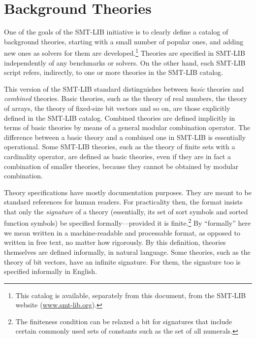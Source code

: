 \section{Background Theories}

One of the goals of the SMT-LIB initiative is 
to clearly define a catalog of background theories,
starting with a small number of popular ones,
and adding new ones as solvers for them are developed.\footnote{
This catalog is available, separately from this document,
from the SMT-LIB website (\href{http://www.smt-lib.org}{www.smt-lib.org}).
}
Theories are specified in SMT-LIB independently of any benchmarks or solvers.
On the other hand, 
each SMT-LIB script refers, indirectly, to one or more theories 
in the SMT-LIB catalog.

This version of the SMT-LIB standard distinguishes 
between \emph{basic} theories and 
\emph{combined} theories.
Basic theories,
such as the theory of real numbers, the theory of arrays, 
the theory of fixed-size bit vectors and so on,
are those explicitly defined in the SMT-LIB catalog.
Combined theories are defined implicitly in terms of basic theories 
by means of a general modular combination operator.
The difference between a basic theory and a combined one
in SMT-LIB is essentially operational.
Some SMT-LIB theories, 
such as the theory of finite sets with a cardinality operator, 
are defined as basic theories,
even if they are in fact a combination of smaller theories,
because they cannot be obtained by modular combination.
%

Theory specifications have mostly documentation purposes.
They are meant to be standard references for human readers.
For practicality then, the format insists that only the \emph{signature} of 
a theory (essentially, its set of sort symbols and sorted function symbols) 
be specified formally---provided it is finite.\footnote{
The finiteness condition can be relaxed a bit for signatures
that include certain commonly used sets of constants such as 
the set of all numerals.
}
By ``formally'' here 
we mean written in a machine-readable and processable format,
as opposed to written in free text, no matter how rigorously.
By this definition, theories themselves are defined informally, 
in natural language.
%
Some theories, such as the theory of bit vectors, have an infinite signature.
For them, the signature too is specified informally in English.

